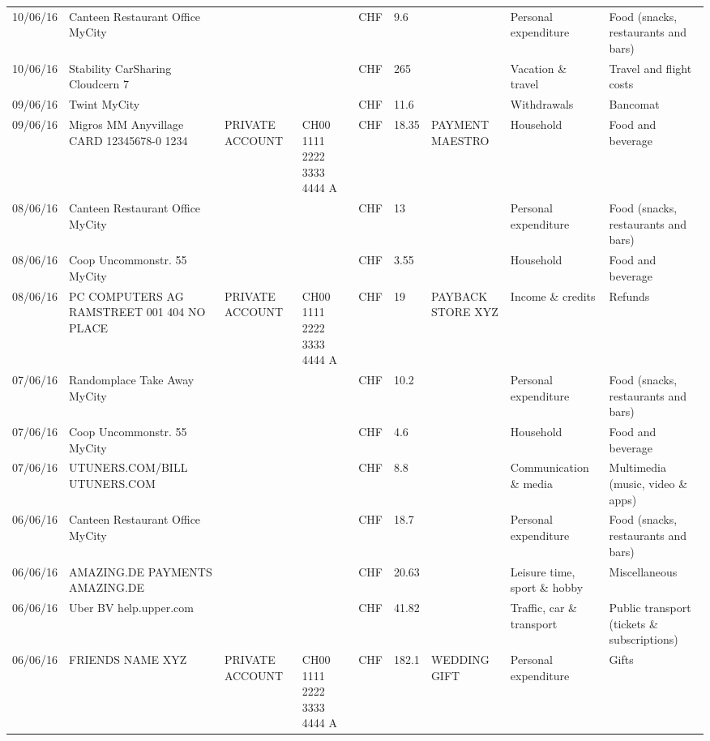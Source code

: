 \begin{landscape}
\begin{adjustwidth}{-2cm}{-2cm}
\begin{tiny}
\begin{longtable}{lp{4cm}llllp{3cm}ll}
		10/06/16 & Canteen Restaurant Office      MyCity &       &       & CHF   & 9.6   &       & Personal expenditure & Food (snacks, restaurants and bars) \\
		10/06/16 & Stability CarSharing      Cloudcern 7 &       &       & CHF   & 265   &       & Vacation \& travel & Travel and flight costs \\
		09/06/16 & Twint               MyCity &       &       & CHF   & 11.6  &       & Withdrawals & Bancomat \\
		09/06/16 & Migros MM Anyvillage CARD 12345678-0 1234 & PRIVATE ACCOUNT & CH00 1111 2222 3333 4444 A & CHF   & 18.35 & PAYMENT MAESTRO & Household & Food and beverage \\
		08/06/16 & Canteen Restaurant Office      MyCity &       &       & CHF   & 13    &       & Personal expenditure & Food (snacks, restaurants and bars) \\
		08/06/16 & Coop Uncommonstr. 55   MyCity &       &       & CHF   & 3.55  &       & Household & Food and beverage \\
		08/06/16 & PC COMPUTERS AG RAMSTREET 001 404 NO PLACE & PRIVATE ACCOUNT & CH00 1111 2222 3333 4444 A & CHF   & 19    & PAYBACK STORE XYZ & Income \& credits & Refunds \\
		07/06/16 & Randomplace Take Away     MyCity &       &       & CHF   & 10.2  &       & Personal expenditure & Food (snacks, restaurants and bars) \\
		07/06/16 & Coop Uncommonstr. 55   MyCity &       &       & CHF   & 4.6   &       & Household & Food and beverage \\
		07/06/16 & UTUNERS.COM/BILL          UTUNERS.COM &       &       & CHF   & 8.8   &       & Communication \& media & Multimedia (music, video \& apps) \\
		06/06/16 & Canteen Restaurant Office      MyCity &       &       & CHF   & 18.7  &       & Personal expenditure & Food (snacks, restaurants and bars) \\
		06/06/16 & AMAZING.DE PAYMENTS       AMAZING.DE &       &       & CHF   & 20.63 &       & Leisure time, sport \& hobby & Miscellaneous \\
		06/06/16 & Uber BV                  help.upper.com &       &       & CHF   & 41.82 &       & Traffic, car \& transport & Public transport (tickets \& subscriptions) \\
		06/06/16 & FRIENDS NAME XYZ & PRIVATE ACCOUNT & CH00 1111 2222 3333 4444 A & CHF   & 182.1 & WEDDING GIFT & Personal expenditure & Gifts \\

\end{longtable}
\end{tiny}
\end{adjustwidth}
\end{landscape}
